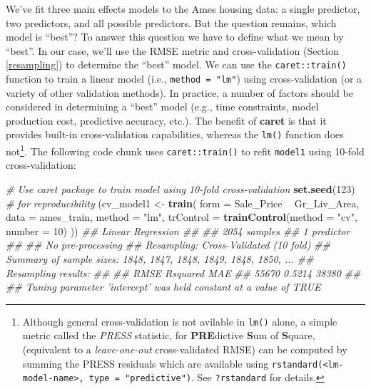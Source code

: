 \documentclass[]{krantz}
\makeatletter
\newenvironment{Shaded}{\begin{snugshade}}{\end{snugshade}}
\newcommand{\CommentTok}[1]{\textcolor[rgb]{0.37,0.37,0.37}{\textit{#1}}}
\newcommand{\DataTypeTok}[1]{\textcolor[rgb]{0.27,0.27,0.27}{#1}}
\newcommand{\DecValTok}[1]{\textcolor[rgb]{0.06,0.06,0.06}{#1}}
\newcommand{\KeywordTok}[1]{\textcolor[rgb]{0.27,0.27,0.27}{\textbf{#1}}}
\newcommand{\NormalTok}[1]{#1}
\newcommand{\OperatorTok}[1]{\textcolor[rgb]{0.43,0.43,0.43}{\textbf{#1}}}
\newcommand{\StringTok}[1]{\textcolor[rgb]{0.5,0.5,0.5}{#1}}
\newenvironment{kframe}{%
\medskip{}
\setlength{\fboxsep}{.8em}
 \def\at@end@of@kframe{}%
 \ifinner\ifhmode%
  \def\at@end@of@kframe{\end{minipage}}%
  \begin{minipage}{\columnwidth}%
 \fi\fi%
 \def\FrameCommand##1{\hskip\@totalleftmargin \hskip-\fboxsep
 \colorbox{shadecolor}{##1}\hskip-\fboxsep
     \hskip-\linewidth \hskip-\@totalleftmargin \hskip\columnwidth}%
 \MakeFramed {\advance\hsize-\width
   \@totalleftmargin\z@ \linewidth\hsize
   \@setminipage}}%
 {\par\unskip\endMakeFramed%
 \at@end@of@kframe}
\renewenvironment{Shaded}{\begin{kframe}}{\end{kframe}}
\makeatother
\begin{document}
We've fit three main effects models to the Ames housing data: a single predictor, two predictors, and all possible predictors. But the question remains, which model is ``best''? To answer this question we have to define what we mean by ``best''. In our case, we'll use the RMSE metric and cross-validation (Section \ref{resampling}) to determine the ``best'' model. We can use the \texttt{caret::train()} function to train a linear model (i.e., \texttt{method\ =\ "lm"}) using cross-validation (or a variety of other validation methods). In practice, a number of factors should be considered in determining a ``best'' model (e.g., time constraints, model production cost, predictive accuracy, etc.). The benefit of \textbf{caret} is that it provides built-in cross-validation capabilities, whereas the \texttt{lm()} function does not\footnote{Although general cross-validation is not avilable in \texttt{lm()} alone, a simple metric called the \emph{PRESS} statistic, for \textbf{PRE}dictive \textbf{S}um of \textbf{S}quare, (equivalent to a \emph{leave-one-out} cross-validated RMSE) can be computed by summing the PRESS residuals which are available using \texttt{rstandard(\textless{}lm-model-name\textgreater{},\ type\ =\ "predictive")}. See \texttt{?rstandard} for details.}. The following code chunk uses \texttt{caret::train()} to refit \texttt{model1} using 10-fold cross-validation:

\begin{Shaded}
\begin{Highlighting}[]
\CommentTok{# Use caret package to train model using 10-fold cross-validation}
\KeywordTok{set.seed}\NormalTok{(}\DecValTok{123}\NormalTok{)  }\CommentTok{# for reproducibility}
\NormalTok{(cv_model1 <-}\StringTok{ }\KeywordTok{train}\NormalTok{(}
  \DataTypeTok{form =}\NormalTok{ Sale_Price }\OperatorTok{~}\StringTok{ }\NormalTok{Gr_Liv_Area, }
  \DataTypeTok{data =}\NormalTok{ ames_train, }
  \DataTypeTok{method =} \StringTok{"lm"}\NormalTok{,}
  \DataTypeTok{trControl =} \KeywordTok{trainControl}\NormalTok{(}\DataTypeTok{method =} \StringTok{"cv"}\NormalTok{, }\DataTypeTok{number =} \DecValTok{10}\NormalTok{)}
\NormalTok{))}
\CommentTok{## Linear Regression }
\CommentTok{## }
\CommentTok{## 2054 samples}
\CommentTok{##    1 predictor}
\CommentTok{## }
\CommentTok{## No pre-processing}
\CommentTok{## Resampling: Cross-Validated (10 fold) }
\CommentTok{## Summary of sample sizes: 1848, 1847, 1848, 1849, 1848, 1850, ... }
\CommentTok{## Resampling results:}
\CommentTok{## }
\CommentTok{##   RMSE   Rsquared  MAE  }
\CommentTok{##   55670  0.5214    38380}
\CommentTok{## }
\CommentTok{## Tuning parameter 'intercept' was held constant at a value of TRUE}
\end{Highlighting}
\end{Shaded}
\end{document}
